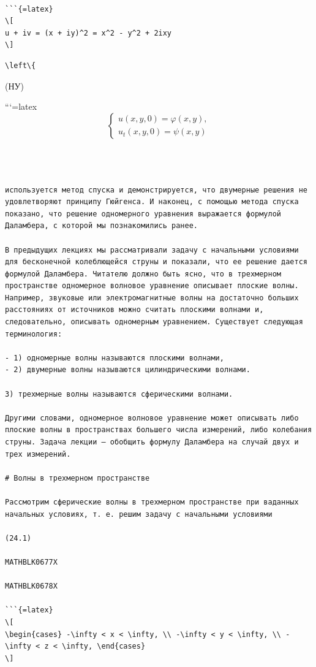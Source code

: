 \documentclass[
]{article}
\begin{document}
\begin{verbatim}

```{=latex}
\[
u + iv = (x + iy)^2 = x^2 - y^2 + 2ixy
\]
\end{verbatim}

\begin{verbatim}
\left\{
\end{verbatim}

(НУ)

```{=latex}
\[
\begin{cases} u(x, y, 0) = \varphi(x, y), \\ u_t(x, y, 0) = \psi(x, y) \end{cases}
\]

\begin{verbatim}

  

используется метод спуска и демонстрируется, что двумерные решения не удовлетворяют принципу Гюйгенса. И наконец, с помощью метода спуска показано, что решение одномерного уравнения выражается формулой Даламбера, с которой мы познакомились ранее.

В предыдущих лекциях мы рассматривали задачу с начальными условиями для бесконечной колеблющейся струны и показали, что ее решение дается формулой Даламбера. Читателю должно быть ясно, что в трехмерном пространстве одномерное волновое уравнение описывает плоские волны. Например, звуковые или электромагнитные волны на достаточно больших расстояниях от источников можно считать плоскими волнами и, следовательно, описывать одномерным уравнением. Существует следующая терминология:

- 1) одномерные волны называются плоскими волнами,
- 2) двумерные волны называются цилиндрическими волнами.

3) трехмерные волны называются сферическими волнами.

Другими словами, одномерное волновое уравнение может описывать либо плоские волны в пространствах большего числа измерений, либо колебания струны. Задача лекции — обобщить формулу Даламбера на случай двух и трех измерений.

# Волны в трехмерном пространстве

Рассмотрим сферические волны в трехмерном пространстве при ваданных начальных условиях, т. е. решим задачу с начальными условиями

(24.1)

MATHBLK0677X

MATHBLK0678X

```{=latex}
\[
\begin{cases} -\infty < x < \infty, \\ -\infty < y < \infty, \\ -\infty < z < \infty, \end{cases}
\]
\end{verbatim}
\end{document}
